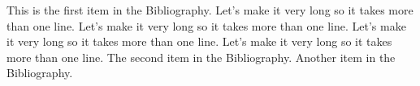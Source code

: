 
%
\begin{singlespace}
\begin{thebibliography}{99}
 This is the first item in the Bibliography.
Let's make it very long so it takes more than one line.
Let's make it very long so it takes more than one line.
Let's make it very long so it takes more than one line.
Let's make it very long so it takes more than one line.
 The second item in the Bibliography.
 Another item in the Bibliography.
\end{thebibliography}
\end{singlespace}

